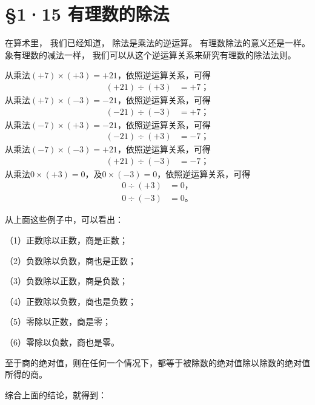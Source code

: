 \section{§1·15 有理数的除法}

在算术里， 我们已经知道， 除法是乘法的逆运算。
有理数除法的意义还是一样。 象有理数的减法一样，
我们可以从这个逆运算关系来研究有理数的除法法则。

从乘法\((+7)\times(+3)=+21\)，依照逆运算关系，可得
\begin{align*}
(+21) \div (+3) &= +7； \tag{1}
\end{align*}
从乘法\((+7)\times(-3)=-21\)，依照逆运算关系，可得
\begin{align*}
(-21) \div (-3) &= +7； \tag{2}
\end{align*}
从乘法\((-7) \times (+3) = -21\)，依照逆运算关系，可得
\begin{align*}
(-21) \div (+3) &= -7； \tag{3}
\end{align*}
从乘法\((-7) \times (-3) = +21\)，依照逆运算关系，可得
\begin{align*}
(+21) \div (-3) &= -7； \tag{4}
\end{align*}
从乘法\(0 \times (+3) = 0\)，及\(0 \times (-3) = 0\)，依照逆运算关系，可得
\begin{align*}
0 \div (+3) &= 0， \tag{5} \\
0 \div (-3) &= 0。 \tag{6}
\end{align*}

从上面这些例子中，可以看出：

（1）正数除以正数，商是正数；

（2）负数除以负数，商也是正数；

（3）负数除以正数，商是负数；

（4）正数除以负数，商也是负数；

（5）零除以正数，商是零；

（6）零除以负数，商也是零。

至于商的绝对值，则在任何一个情况下，都等于被除数的绝对值除以除数的绝对值所得的商。

综合上面的结论，就得到：

\begin{center}
\end{center}

